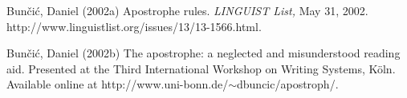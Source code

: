 \documentclass[12pt]{article}
\begin{document}
\begin{thebibliography}{}

\item{Bun\v{c}i\'{c}, Daniel (2002a)}
Apostrophe rules.
\emph{LINGUIST List,} May 31, 2002.
http://www.linguistlist.org/issues/13/13-1566.html.

\item{Bun\v{c}i\'{c}, Daniel (2002b)}
The apostrophe: a neglected and misunderstood reading aid.
Presented at the Third International Workshop on Writing Systems, K\"oln.
Available online at
http://www.uni-bonn.de/$\sim$dbuncic/apostroph/.

\end{thebibliography}
\end{document}
